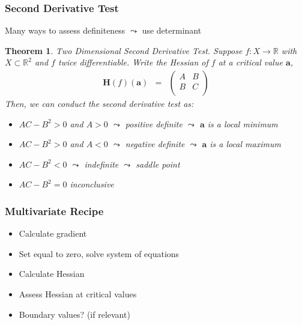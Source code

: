 \documentclass[handout]{beamer}
\newtheorem{thm}{Theorem}
\numberwithin{equation}{section}
\begin{document}
\begin{frame}
\frametitle{Second Derivative Test} 

Many ways to assess definiteness $\leadsto$ use determinant \pause

\begin{thm} 
Two Dimensional Second Derivative Test.  Suppose $f:X \rightarrow \mathbb{R}$ with $X \subset \mathbb{R}^{2}$ and $f$ twice differentiable.  Write the Hessian of $f$ at a critical value $\boldsymbol{a}$, 
\begin{eqnarray}
\boldsymbol{H}(f)(\boldsymbol{a}) & = & \begin{pmatrix} 
	A & B \\
	B & C \\
	\end{pmatrix} \nonumber 
	\end{eqnarray}
Then, we can conduct the second derivative test as:
\begin{itemize}
\item[-] $AC - B^2> 0$ and $A>0$ $\leadsto$ positive definite $\leadsto$ $\boldsymbol{a}$ is a local minimum 
\item[-] $AC - B^2> 0 $ and $A<0$ $\leadsto$ negative definite $\leadsto$ $\boldsymbol{a}$ is a local maximum
\item[-] $AC - B^2<0 $ $\leadsto$ indefinite $\leadsto$ saddle point 
\item[-] $AC- B^2 = 0$ inconclusive
\end{itemize}
	
\end{thm}

\end{frame}



\begin{frame}
\frametitle{Multivariate Recipe}

\begin{itemize}
\item[1)] Calculate gradient \pause
\item[2)] Set equal to zero, solve system of equations \pause
\item[3)] Calculate Hessian \pause
\item[4)] Assess Hessian at critical values \pause
\item[5)] Boundary values?  (if relevant)
\end{itemize}

\end{frame}
\end{document}
